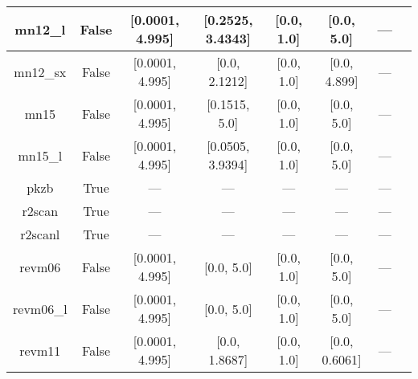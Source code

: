 \begin{tabular}{|c|c|c|c|c|c|c|l|}
       mn12\_l &                 False &   [0.0001, 4.995] &  [0.2525, 3.4343] &        [0.0, 1.0] &     [0.0, 5.0] &         --- &                                                           \cite{Peverati2012_13171} \\ \hline
      mn12\_sx &                 False &   [0.0001, 4.995] &     [0.0, 2.1212] &        [0.0, 1.0] &   [0.0, 4.899] &         --- &                                                           \cite{Peverati2012_16187} \\ \hline
          mn15 &                 False &   [0.0001, 4.995] &     [0.1515, 5.0] &        [0.0, 1.0] &     [0.0, 5.0] &         --- &                                                                  \cite{Yu2016_5032} \\ \hline
       mn15\_l &                 False &   [0.0001, 4.995] &  [0.0505, 3.9394] &        [0.0, 1.0] &     [0.0, 5.0] &         --- &                                                                  \cite{Yu2016_1280} \\ \hline
          pkzb &                  True &               --- &               --- &               --- &            --- &         --- &                                                              \cite{Perdew1999_2544} \\ \hline
        r2scan &                  True &               --- &               --- &               --- &            --- &         --- &                                            \cite{Furness2020_8208,Furness2020_9248} \\ \hline
       r2scanl &                  True &               --- &               --- &               --- &            --- &         --- &                           \cite{Mejia2020_121109,Furness2020_8208,Furness2020_9248} \\ \hline
        revm06 &                 False &   [0.0001, 4.995] &        [0.0, 5.0] &        [0.0, 1.0] &     [0.0, 5.0] &         --- &                                                               \cite{Wang2018_10257} \\ \hline
     revm06\_l &                 False &   [0.0001, 4.995] &        [0.0, 5.0] &        [0.0, 1.0] &     [0.0, 5.0] &         --- &                                                                \cite{Wang2017_8487} \\ \hline
        revm11 &                 False &   [0.0001, 4.995] &     [0.0, 1.8687] &        [0.0, 1.0] &  [0.0, 0.6061] &         --- &                                                               \cite{Verma2019_2966} \\ \hline

\end{tabular}
